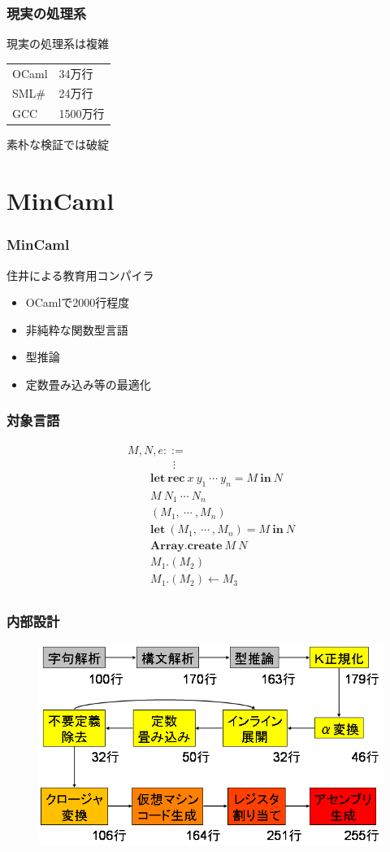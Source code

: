\documentclass[dvipdfmx,cjk,xcolor=dvipsnames,envcountsect,notheorems,12pt]{beamer}
\theoremstyle{definition}
\newcommand{\keyword}[1]{\mathbf{#1}}
\newcommand{\LET}{\keyword{let}}
\newcommand{\REC}{\keyword{rec}}
\newcommand{\ARRAY}{\keyword{Array}}
\newcommand{\CREATE}{\keyword{create}}
\newcommand{\IN}{\keyword{in}}
\begin{document}
\begin{frame}
	\frametitle{現実の処理系}
	\LARGE 現実の処理系は複雑

	{\Large
	\begin{tabular}{ll}
		OCaml & 34万行 \\
		SML\# & 24万行 \\
		GCC & 1500万行
	\end{tabular}}

	\vfill
	素朴な検証では破綻
\end{frame}

\section{MinCaml}

\begin{frame}
	\frametitle{MinCaml}
	\LARGE 住井による教育用コンパイラ
	\begin{itemize}
		\item OCamlで2000行程度
		\item 非純粋な関数型言語
		\item 型推論
		\item 定数畳み込み等の最適化
	\end{itemize}
\end{frame}

\begin{frame}
	\frametitle{対象言語}
	\Large
	\[
	\begin{array}{l}
		M, N, e ::= \\
		\qquad \qquad \vdots\\
		\qquad \LET~\REC~x~y_1~\cdots~y_n=M~\IN~N\\
		\qquad M~N_1~\cdots~N_n\\
		\qquad (M_1,~\cdots~,M_n)\\
		\qquad \LET~(M_1,~\cdots~,M_n)=M~\IN~N\\
		\qquad \ARRAY.\CREATE~M~N\\
		\qquad M_1.(M_2)\\
		\qquad M_1.(M_2)\leftarrow M_3\\
	\end{array}
	\]
\end{frame}

\begin{frame}
	\frametitle{内部設計}
	\begin{figure}[htb]
		\centering
		\includegraphics[width=12cm,clip]{mincaml.png}
	\end{figure}
\end{frame}
\end{document}
